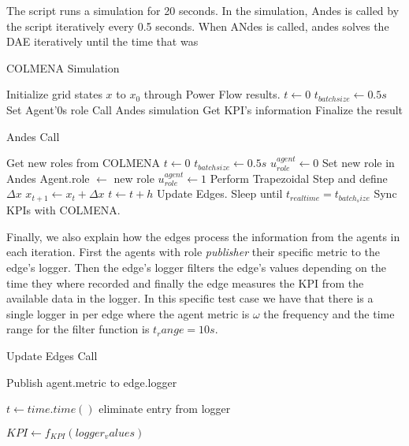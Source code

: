 The script runs a simulation for 20 seconds. In the simulation, Andes is called by the script iteratively every 0.5 seconds. When ANdes is called, andes solves the DAE iteratively until the time that was 

\begin{algorithm}
    \caption{COLMENA Simulation}
    \begin{algorithmic}[1]
    \State Initialize grid states $x$ to $x_0$ through Power Flow results.
    \State $t \gets 0$
    \State $t_{batch size} \gets 0.5 s$
            \State Set Agent'0s role
        \EndFor
        \State Call Andes simulation
        \State Get KPI's information
    \EndWhile
    \State Finalize the result
    \end{algorithmic}
\end{algorithm}

\begin{algorithm}
    \caption{Andes Call}
    \begin{algorithmic}[1]
    \State Get new roles from COLMENA 
    \State $t \gets 0$
    \State $t_{batch size} \gets 0.5 s$
        \State $u^{agent}_{role} \gets  0$
        \State Set new role in Andes 
        \State  Agent.role $\gets$ new role
        \State $u^{agent}_{role} \gets  1$
    \EndFor
        \State Perform Trapezoidal Step and define $\Delta x$
        \State $x_{t+1} \gets x_t + \Delta x$
        \State $t \gets t + h$
    \EndWhile
    \State Update Edges.
    \State Sleep until $t_{real time} = t_{batch_size}$
    \State Sync KPIs with COLMENA.
    \end{algorithmic}
\end{algorithm}

Finally, we also explain how the edges process the information from the agents in each iteration. First the agents with role \textit{publisher} their specific metric to the edge's logger. Then the edge's logger filters the edge's values depending on the time they where recorded and finally the edge measures the KPI from the available data in the logger. In this specific test case we have that there is a single logger in per edge where the agent metric is $\omega$ the frequency and the time range for the filter function is $t_range = 10s$.

\begin{algorithm}
    \caption{Update Edges Call}
    \begin{algorithmic}[1]
                \State Publish agent.metric to edge.logger
            \EndIf
        \EndFor

            \State $t \gets time.time()$
                \State eliminate entry from logger
            \EndIf
        \EndFor

        \State $KPI \gets f_{KPI}(logger_values)$
    \EndFor
    \end{algorithmic}
\end{algorithm}

